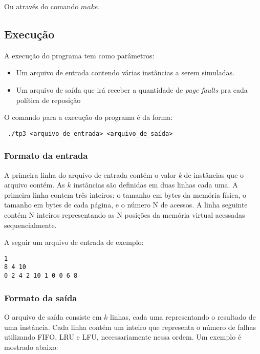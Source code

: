 \documentclass[12pt]{article}
\begin{document}
Ou através do comando $make$.

\subsection{Execução}

A execução do programa tem como parâmetros:
\begin{itemize}
\item Um arquivo de entrada contendo várias instâncias a serem simuladas.
\item Um arquivo de saída que irá receber a quantidade de \textit{page faults} pra cada política de reposição
\end{itemize}

O comando para a execução do programa é da forma:

\begin{footnotesize}
\begin{verbatim} ./tp3 <arquivo_de_entrada> <arquivo_de_saída>\end{verbatim}
\end{footnotesize}


\subsubsection{Formato da entrada}
\label{entrada}

A primeira linha do arquivo de entrada contém o valor \textit{k} de instâncias que o arquivo contém. As $k$ instâncias são definidas em duas linhas cada uma. A primeira linha contem três inteiros: o tamanho em bytes da memória física, o tamanho em bytes de cada página, e o número N de acessos. A linha seguinte contém N inteiros representando as N posições da memória virtual acessadas sequencialmente.

A seguir um arquivo de entrada de exemplo:

\begin{verbatim}
1
8 4 10
0 2 4 2 10 1 0 0 6 8
\end{verbatim}

\subsubsection{Formato da saída}
\label{saida}

O arquivo de saída consiste em $k$ linhas, cada uma representando o resultado de uma instância. Cada linha contém um inteiro que representa o número de falhas utilizando FIFO, LRU e LFU, necessariamente nessa ordem. Um exemplo é mostrado abaixo:
\end{document}
